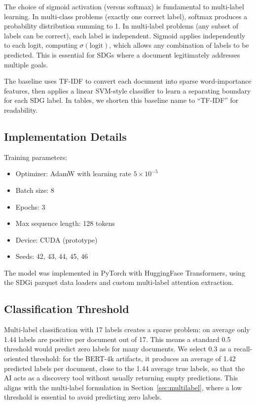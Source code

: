 \documentclass[12pt,a4paper]{article}
\begin{document}
The choice of sigmoid activation (versus softmax) is fundamental to multi-label learning. In multi-class problems (exactly one correct label), softmax produces a probability distribution summing to 1. In multi-label problems (any subset of labels can be correct), each label is independent. Sigmoid applies independently to each logit, computing $\sigma(\text{logit})$, which allows any combination of labels to be predicted. This is essential for SDGs where a document legitimately addresses multiple goals.

The baseline uses TF-IDF to convert each document into sparse word-importance features, then applies a linear SVM-style classifier to learn a separating boundary for each SDG label. In tables, we shorten this baseline name to ``TF-IDF'' for readability.

\subsection{Implementation Details}

Training parameters:
\begin{itemize}
\item Optimizer: AdamW with learning rate $5 \times 10^{-5}$
\item Batch size: 8
\item Epochs: 3
\item Max sequence length: 128 tokens
\item Device: CUDA (prototype)
\item Seeds: 42, 43, 44, 45, 46
\end{itemize}

The model was implemented in PyTorch with HuggingFace Transformers, using the SDGi parquet data loaders and custom multi-label attention extraction.

\subsection{Classification Threshold}

Multi-label classification with 17 labels creates a sparse problem: on average only 1.44 labels are positive per document out of 17. This means a standard 0.5 threshold would predict zero labels for many documents. We select 0.3 as a recall-oriented threshold: for the BERT-4k artifacts, it produces an average of 1.42 predicted labels per document, close to the 1.44 average true labels, so that the AI acts as a discovery tool without usually returning empty predictions. This aligns with the multi-label formulation in Section~\ref{sec:multilabel}, where a low threshold is essential to avoid predicting zero labels.
\end{document}
